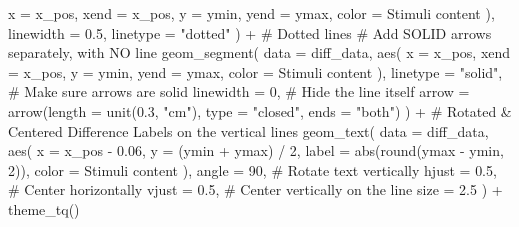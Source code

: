 \documentclass[
  bookmarksnumbered]{article}
\newenvironment{Shaded}{\begin{snugshade}}{\end{snugshade}}
\newcommand{\AttributeTok}[1]{\textcolor[rgb]{0.80,0.80,0.80}{#1}}
\newcommand{\CommentTok}[1]{\textcolor[rgb]{0.50,0.62,0.50}{#1}}
\newcommand{\DecValTok}[1]{\textcolor[rgb]{0.86,0.86,0.80}{#1}}
\newcommand{\FloatTok}[1]{\textcolor[rgb]{0.75,0.75,0.82}{#1}}
\newcommand{\FunctionTok}[1]{\textcolor[rgb]{0.94,0.94,0.56}{#1}}
\newcommand{\NormalTok}[1]{\textcolor[rgb]{0.80,0.80,0.80}{#1}}
\newcommand{\SpecialCharTok}[1]{\textcolor[rgb]{0.86,0.64,0.64}{#1}}
\newcommand{\StringTok}[1]{\textcolor[rgb]{0.80,0.58,0.58}{#1}}
\begin{document}
\begin{Shaded}
\begin{Highlighting}[]
      \AttributeTok{x =}\NormalTok{ x\_pos, }\AttributeTok{xend =}\NormalTok{ x\_pos,}
      \AttributeTok{y =}\NormalTok{ ymin, }\AttributeTok{yend =}\NormalTok{ ymax,}
      \AttributeTok{color =} \StringTok{\textasciigrave{}}\AttributeTok{Stimuli content}\StringTok{\textasciigrave{}}
\NormalTok{    ),}
    \AttributeTok{linewidth =} \FloatTok{0.5}\NormalTok{,}
    \AttributeTok{linetype =} \StringTok{"dotted"}
\NormalTok{  ) }\SpecialCharTok{+} \CommentTok{\# Dotted lines}
  \CommentTok{\# Add SOLID arrows separately, with NO line}
  \FunctionTok{geom\_segment}\NormalTok{(}
    \AttributeTok{data =}\NormalTok{ diff\_data,}
    \FunctionTok{aes}\NormalTok{(}
      \AttributeTok{x =}\NormalTok{ x\_pos, }\AttributeTok{xend =}\NormalTok{ x\_pos,}
      \AttributeTok{y =}\NormalTok{ ymin, }\AttributeTok{yend =}\NormalTok{ ymax,}
      \AttributeTok{color =} \StringTok{\textasciigrave{}}\AttributeTok{Stimuli content}\StringTok{\textasciigrave{}}
\NormalTok{    ),}
    \AttributeTok{linetype =} \StringTok{"solid"}\NormalTok{, }\CommentTok{\# Make sure arrows are solid}
    \AttributeTok{linewidth =} \DecValTok{0}\NormalTok{, }\CommentTok{\# Hide the line itself}
    \AttributeTok{arrow =} \FunctionTok{arrow}\NormalTok{(}\AttributeTok{length =} \FunctionTok{unit}\NormalTok{(}\FloatTok{0.3}\NormalTok{, }\StringTok{"cm"}\NormalTok{), }\AttributeTok{type =} \StringTok{"closed"}\NormalTok{, }\AttributeTok{ends =} \StringTok{"both"}\NormalTok{)}
\NormalTok{  ) }\SpecialCharTok{+}
  \CommentTok{\# Rotated \& Centered Difference Labels on the vertical lines}
  \FunctionTok{geom\_text}\NormalTok{(}
    \AttributeTok{data =}\NormalTok{ diff\_data,}
    \FunctionTok{aes}\NormalTok{(}
      \AttributeTok{x =}\NormalTok{ x\_pos }\SpecialCharTok{{-}} \FloatTok{0.06}\NormalTok{, }\AttributeTok{y =}\NormalTok{ (ymin }\SpecialCharTok{+}\NormalTok{ ymax) }\SpecialCharTok{/} \DecValTok{2}\NormalTok{,}
      \AttributeTok{label =} \FunctionTok{abs}\NormalTok{(}\FunctionTok{round}\NormalTok{(ymax }\SpecialCharTok{{-}}\NormalTok{ ymin, }\DecValTok{2}\NormalTok{)),}
      \AttributeTok{color =} \StringTok{\textasciigrave{}}\AttributeTok{Stimuli content}\StringTok{\textasciigrave{}}
\NormalTok{    ),}
    \AttributeTok{angle =} \DecValTok{90}\NormalTok{, }\CommentTok{\# Rotate text vertically}
    \AttributeTok{hjust =} \FloatTok{0.5}\NormalTok{, }\CommentTok{\# Center horizontally}
    \AttributeTok{vjust =} \FloatTok{0.5}\NormalTok{, }\CommentTok{\# Center vertically on the line}
    \AttributeTok{size =} \FloatTok{2.5}
\NormalTok{  ) }\SpecialCharTok{+}
  \FunctionTok{theme\_tq}\NormalTok{()}
\end{Highlighting}
\end{Shaded}
\end{document}
